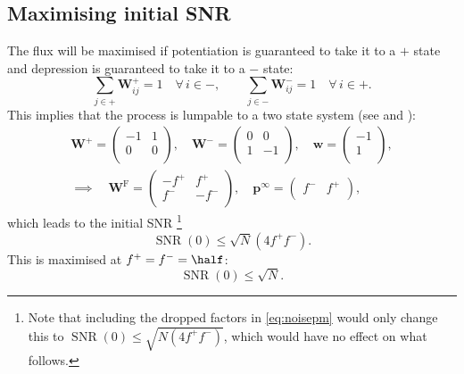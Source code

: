\documentclass[12pt]{article}
\newcommand{\I}{\mathbf{I}}
\newcommand{\eq}{\mathbf{p}^\infty}
\newcommand{\w}{\mathbf{w}}
\newcommand{\W}{\mathbf{W}}
\newcommand{\frg}{\W^{\mathrm{F}}}
\DeclareMathOperator{\SNR}{SNR}
\begin{document}
\subsection{Maximising initial SNR}\label{sec:initmax}

The flux will be maximised if potentiation is guaranteed to take it to a $+$ state and depression is guaranteed to take it to a $-$ state:
%
\begin{equation}\label{eq:guarantee}
  \sum_{j\in+} \W^+_{ij} = 1 \quad \forall\, i\in-,
  \qquad
  \sum_{j\in-} \W^-_{ij} = 1 \quad \forall\, i\in+.
\end{equation}
%
This implies that the process is lumpable to a two state system (see  and ):
%
\begin{multline}\label{eq:binarylump}
  \W^+ = \begin{pmatrix}
           -1 & 1 \\
           0 & 0 \\
         \end{pmatrix}
  ,\quad
  \W^- = \begin{pmatrix}
           0 & 0 \\
           1 & -1 \\
         \end{pmatrix}
  ,\quad
  \w = \begin{pmatrix}
           -1 \\
           1 \\
         \end{pmatrix}
  ,\\ \implies\quad
  \frg = \begin{pmatrix}
           -f^+ & f^+ \\
           f^- & -f^- \\
         \end{pmatrix}
  ,\quad
  \eq = \begin{pmatrix}
           f^- & f^+ \\
         \end{pmatrix}
  ,%
\end{multline}
%
which leads to the initial SNR %
\footnote{Note that including the dropped factors in \eqref{eq:noisepm} would only change this to
$\SNR(0) \leq \sqrt{N (4f^+f^-)}$,
which would have no effect on what follows.}
%
\begin{equation}\label{eq:binarySNR}
  \SNR(0) \leq \sqrt{N} (4f^+f^-) .
\end{equation}
%
This is maximised at $f^+=f^-=\half$:
%
\begin{equation}\label{eq:initmax}
  \SNR(0) \leq \sqrt{N}.
\end{equation}
%
\end{document}
